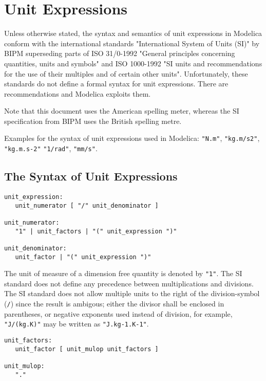 \chapter{Unit Expressions}

Unless otherwise stated, the syntax and semantics of unit expressions in
Modelica conform with the international standards
"International System of Units (SI)" by BIPM superseding parts of
ISO 31/0-1992
"General principles concerning quantities, units and symbols" and ISO
1000-1992 "SI units and recommendations for the use of their multiples
and of certain other units".
Unfortunately, these standards do not define a formal syntax for
unit expressions. There are recommendations and Modelica exploits them.

Note that this document uses the American spelling meter, whereas the SI specification from BIPM uses the British spelling metre.

Examples for the syntax of unit expressions used in Modelica: \lstinline!"N.m"!,
\lstinline!"kg.m/s2"!, \lstinline!"kg.m.s-2"! \lstinline!"1/rad"!,
\lstinline!"mm/s"!.

\section{The Syntax of Unit Expressions}
\begin{lstlisting}[language=grammar]
unit_expression:
   unit_numerator [ "/" unit_denominator ]

unit_numerator:
   "1" | unit_factors | "(" unit_expression ")"

unit_denominator:
   unit_factor | "(" unit_expression ")"
\end{lstlisting}

The unit of measure of a dimension free quantity is denoted by \lstinline!"1"!. The
SI standard does not define any precedence between multiplications and
divisions. The SI standard does not allow multiple units to the right of the
division-symbol (\lstinline!/!) since the result is ambigous; either the divisor shall be enclosed in parentheses,
or negative exponents used instead of division, for example, \lstinline!"J/(kg.K)"! may be written as \lstinline!"J.kg-1.K-1"!.

\begin{lstlisting}[language=grammar]
unit_factors:
   unit_factor [ unit_mulop unit_factors ]

unit_mulop:
   "."
\end{lstlisting}

